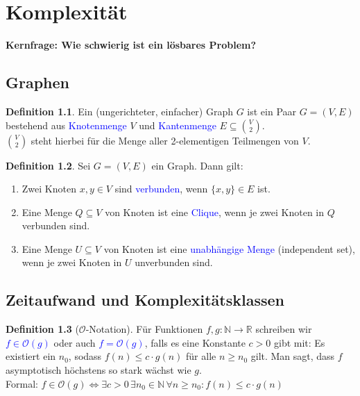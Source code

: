 \documentclass{scrreprt}
\theoremstyle{definition}
\newtheorem{Definition}{Definition}[section]
\theoremstyle{example}
\theoremstyle{algorithm}
\begin{document}
\chapter{Komplexität}

\textbf{Kernfrage: Wie schwierig ist ein lösbares Problem?}
\section{Graphen}
\begin{Definition}
Ein (ungerichteter, einfacher) Graph $G$ ist ein Paar $G=(V,E)$ bestehend aus \textcolor{blue}{Knotenmenge} $V$ und \textcolor{blue}{Kantenmenge} $E\subseteq \binom{V}{2}$.\\
$\binom{V}{2}$ steht hierbei für die Menge aller 2-elementigen Teilmengen von $V$.
\end{Definition}
\begin{Definition}
Sei $G=(V,E)$ ein Graph. Dann gilt:
\begin{enumerate}
\item Zwei Knoten $x,y \in V$ sind \textcolor{blue}{verbunden}, wenn $\{x,y\} \in E$ ist.
\item Eine Menge $Q \subseteq V$ von Knoten ist eine \textcolor{blue}{Clique}, wenn je zwei Knoten in $Q$ verbunden sind.
\item Eine Menge $U \subseteq V$ von Knoten ist eine \textcolor{blue}{unabhängige Menge} (independent set), wenn je zwei Knoten in $U$ unverbunden sind.
\end{enumerate}
\end{Definition}

\section{Zeitaufwand und Komplexitätsklassen}
\begin{Definition}[$\mathcal{O}$-Notation]
Für Funktionen $f, g: \mathbb{N} \rightarrow \mathbb{R}$ schreiben wir \textcolor{blue}{$f \in \mathcal{O}(g)$} oder auch \textcolor{blue}{$f=\mathcal{O}(g)$}, falls es eine Konstante $c>0$ gibt mit: Es existiert ein $n_0$, sodass $f(n) \leq c \cdot g(n)$ für alle $n\geq n_0$ gilt. Man sagt, dass $f$ asymptotisch höchstens so stark wächst wie $g$.\\
Formal: $f \in \mathcal{O}(g) \Leftrightarrow \exists c>0 \, \exists n_0 \in \mathbb{N}\, \forall n\geq n_0:f(n)\leq c \cdot g(n)$
\end{Definition}
\end{document}
